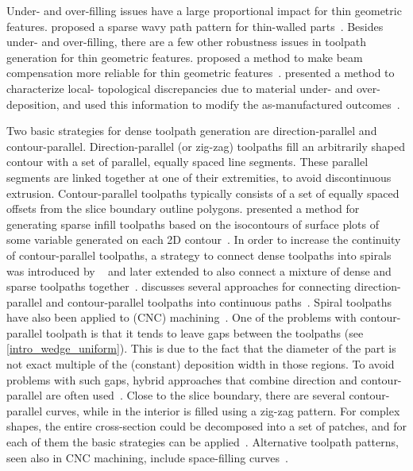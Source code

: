 Under- and over-filling issues have a large proportional impact for thin geometric features.
\citeauthor{Jin2017a} proposed a sparse wavy path pattern for thin-walled parts~\cite{Jin2017a}.
Besides under- and over-filling, there are a few other robustness issues in toolpath generation for thin geometric features.
\citeauthor{Moesen2011} proposed a method to make beam compensation more reliable for thin geometric features~\cite{Moesen2011}.
\citeauthor{Behandish2019a} presented a method to characterize local- topological discrepancies due to material under- and over-deposition, and used this information to modify the as-manufactured outcomes~\cite{Behandish2019a}. 

Two basic strategies for dense toolpath generation are direction-parallel and contour-parallel.
Direction-parallel (or zig-zag) toolpaths fill an arbitrarily shaped contour with a set of parallel, equally spaced line segments.
These parallel segments are linked together at one of their extremities, to avoid discontinuous extrusion.
Contour-parallel toolpaths typically consists of a set of equally spaced offsets from the slice boundary outline polygons.
\citeauthor{steuben2016implicit} presented a method for generating sparse infill toolpaths based on the isocontours of surface plots of some variable generated on each 2D contour~\cite{steuben2016implicit}.
In order to increase the continuity of contour-parallel toolpaths, a strategy to connect dense toolpaths into spirals was introduced by \citeauthor{Zhao2016}~\cite{Zhao2016} and later extended to also connect a mixture of dense and sparse toolpaths together~\cite{KUIPERS2019CAD}.
\citeauthor{Jin2017RCIM} discusses several approaches for connecting direction-parallel and contour-parallel toolpaths into continuous paths~\cite{Jin2017RCIM}.
Spiral toolpaths have also been applied to (CNC) machining~\cite{Held2009,Huang2017}.
One of the problems with contour-parallel toolpath is that it tends to leave gaps between the toolpaths (see \cref{intro_wedge_uniform}).
This is due to the fact that the diameter of the part is not exact multiple of the (constant) deposition width in those regions.
To avoid problems with such gaps, hybrid approaches that combine direction and contour-parallel are often used~\cite{Mcmains2000DETC,Jin2013adaptive}.
Close to the slice boundary, there are several contour-parallel curves, while in the interior is filled using a zig-zag pattern.
For complex shapes, the entire cross-section could be decomposed into a set of patches, and for each of them the basic strategies can be applied~\cite{Ding2014,Jin2017RCIM}.
Alternative toolpath patterns, seen also in CNC machining, include space-filling curves~\cite{Cox1994CAD,Griffiths1994,Shaikh2016}.

